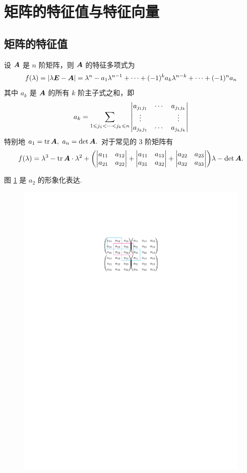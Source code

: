 \section{矩阵的特征值与特征向量}

\subsection{矩阵的特征值}

\begin{theorem}[特征多项式展开定理]
    设 $\vb*{A}$ 是 $n$ 阶矩阵，则 $\vb*{A}$ 的特征多项式为 
    $$f(\lambda)=|\lambda\vb*{E}-\vb*{A}|=\lambda^n-a_1\lambda^{n-1}+\cdots+(-1)^ka_k\lambda^{n-k}+\cdots+(-1)^na_n$$
    其中 $a_k$ 是 $\vb*{A}$ 的所有 $k$ 阶主子式之和，即 
    $$a_k=\sum_{1\leqslant j_1<\cdots<j_k\leqslant n}\mqty|a_{j_1j_1}&\cdots&a_{j_1j_k}\\\vdots&&\vdots\\a_{j_kj_1}&\cdots&a_{j_kj_k}|$$
    特别地 $a_1=\tr\vb*{A},~a_n=\det\vb*{A}.$
    对于常见的 3 阶矩阵有 $$f(\lambda)=\lambda^3-\tr\vb*{A}\cdot\lambda^2+\qty(\mqty|a_{11}&a_{12}\\a_{21}&a_{22}|+\mqty|a_{11}&a_{13}\\a_{31}&a_{32}|+\mqty|a_{22}&a_{23}\\a_{32}&a_{33}|)\lambda-\det\vb*{A}.$$
\end{theorem}

图 \ref{fig:kjiezzshi} 是 $a_2$ 的形象化表达.
\begin{figure}[H]
    \centering
    \includegraphics[scale=1]{figures/kjiezzshi.pdf}
    \caption{}
    \label{fig:kjiezzshi}
\end{figure}

